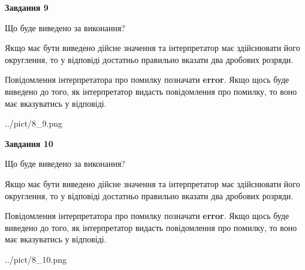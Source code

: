 \documentclass[12pt, ukrainian]{article}
\begin{document}
{\begin {Large}
{\begin {center}\textbf{Завдання 9}\end {center}}\par
Що буде виведено за виконання? \par

Якщо має бути виведено дійсне значення та інтерпретатор має здійснювати його округлення, 
то у відповіді достатньо правильно вказати два дробових розряди.

Повідомлення інтерпретатора про помилку позначати \textbf{error}.
Якщо щось буде виведено до того, як інтерпретатор видасть повідомлення про помилку, 
то воно має вказуватись у відповіді. \par

\begin{center}
	{../pict/8_9.png}
\end{center}
\newpage

{\begin {center}\textbf{Завдання 10}\end {center}}\par
Що буде виведено за виконання? \par

Якщо має бути виведено дійсне значення та інтерпретатор має здійснювати його округлення, 
то у відповіді достатньо правильно вказати два дробових розряди.

Повідомлення інтерпретатора про помилку позначати \textbf{error}.
Якщо щось буде виведено до того, як інтерпретатор видасть повідомлення про помилку, 
то воно має вказуватись у відповіді. \par

\begin{center}
	{../pict/8_10.png}
\end{center}
\newpage

\end {Large}}
\end{document}
